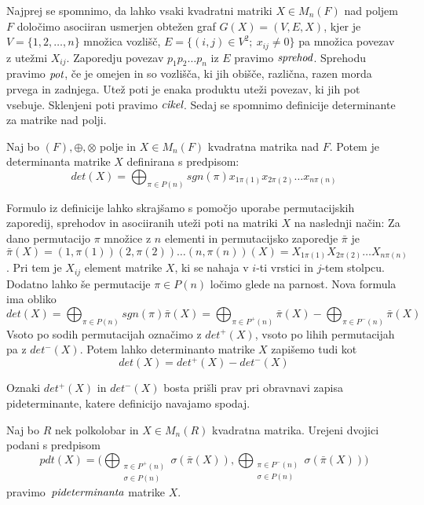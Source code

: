 \documentclass[mat1]{fmfdelo}
\newcommand{\pojem}[1]{\ensuremath{\emph{#1}}}
\begin{document}
Najprej se spomnimo, da lahko vsaki kvadratni matriki $X\in M_n(F)$ nad poljem $F$ določimo asociiran usmerjen obtežen graf $G(X) = (V, E, X)$, kjer je $V= \{1, 2, \ldots, n\}$ množica vozlišč, $E=\{(i, j)\in V^2;~x_{ij}\neq 0\}$ pa množica povezav z utežmi $X_{ij}$. Zaporedju povezav $p_1p_2\ldots p_n$ iz $E$ pravimo \pojem{sprehod}. Sprehodu pravimo \pojem{pot}, če je omejen in so vozlišča, ki jih obišče, različna, razen morda prvega in zadnjega. Utež poti je enaka produktu uteži povezav, ki jih pot vsebuje. Sklenjeni poti pravimo \pojem{cikel}. 
Sedaj se spomnimo definicije determinante za matrike nad polji. 
\begin{definicija}
	Naj bo $(F), \oplus, \otimes$ polje in $X\in M_n(F)$ kvadratna matrika nad $F$. Potem je determinanta matrike $X$ definirana s predpisom: $$det(X) = \bigoplus_{\pi\in P(n)}sgn(\pi)x_{1\pi(1)}x_{2\pi(2)}\ldots x_{n\pi(n)}$$
\end{definicija}
Formulo iz definicije lahko skrajšamo s pomočjo uporabe permutacijskih zaporedij, sprehodov in asociiranih uteži poti na matriki $X$ na naslednji način:
Za dano permutacijo $\pi$ množice z $n$ elementi in permutacijsko zaporedje $\bar{\pi}$ je $\bar{\pi}(X) = (1, \pi(1))(2, \pi(2))\ldots (n, \pi(n))(X) = X_{1\pi(1)}X_{2\pi(2)}\ldots X_{n\pi(n)}$. Pri tem je $X_{ij}$ element matrike $X$, ki se nahaja v $i$-ti vrstici in $j$-tem stolpcu.
Dodatno lahko še permutacije $\pi\in P(n)$ ločimo glede na parnost. Nova formula ima obliko $$det(X) = \bigoplus_{\pi\in P(n)}sgn(\pi)\bar{\pi}(X) = \bigoplus_{\pi\in P^{+}(n)}\bar{\pi}(X) - \bigoplus_{\pi\in P^{-}(n)}\bar{\pi}(X)$$
Vsoto po sodih permutacijah označimo z $det^{+}(X)$, vsoto po lihih permutacijah pa z $det^{-}(X)$. Potem lahko determinanto matrike $X$ zapišemo tudi kot $$det(X) = det^{+}(X) - det^{-}(X)$$

Oznaki $det^{+}(X)$ in $det^{-}(X)$ bosta prišli prav pri obravnavi zapisa pideterminante, katere definicijo navajamo spodaj.

\begin{definicija}
	Naj bo $R$ nek polkolobar in $X\in M_n(R)$ kvadratna matrika. Urejeni dvojici podani s predpisom $$pdt(X) = \big(\bigoplus_{\substack{\pi\in P^{+}(n) \\ \sigma\in P(n)}}\sigma(\bar{\pi}(X)), \bigoplus_{\substack{\pi\in P^{-}(n) \\ \sigma\in P(n)}}\sigma(\bar{\pi}(X))\big)$$ pravimo~\pojem{pideterminanta} matrike $X$. 
\end{definicija}
\end{document}
